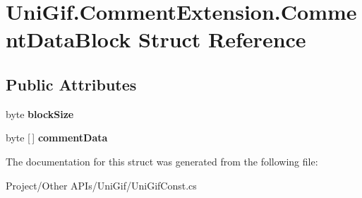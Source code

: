 \hypertarget{struct_uni_gif_1_1_comment_extension_1_1_comment_data_block}{}\section{Uni\+Gif.\+Comment\+Extension.\+Comment\+Data\+Block Struct Reference}
\label{struct_uni_gif_1_1_comment_extension_1_1_comment_data_block}
\subsection*{Public Attributes}
\begin{DoxyCompactItemize}
\item 
\mbox{\label{struct_uni_gif_1_1_comment_extension_1_1_comment_data_block_aaf0811f8f5e60aa4525d176fde7ff6c0}} 
byte {\bfseries block\+Size}
\item 
\mbox{\label{struct_uni_gif_1_1_comment_extension_1_1_comment_data_block_a7c64990ce578bb5473028decc8b1cef2}} 
byte \mbox{[}$\,$\mbox{]} {\bfseries comment\+Data}
\end{DoxyCompactItemize}


The documentation for this struct was generated from the following file\+:\begin{DoxyCompactItemize}
\item 
Project/\+Other A\+P\+Is/\+Uni\+Gif/Uni\+Gif\+Const.\+cs\end{DoxyCompactItemize}
